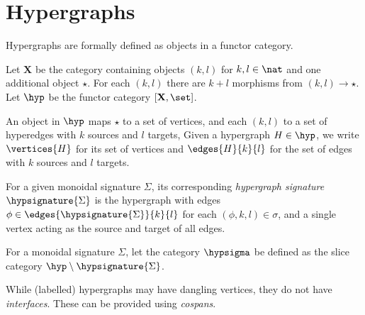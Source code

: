 \section{Hypergraphs}

Hypergraphs are formally defined as objects in a functor category.

\begin{definition}[Hypergraph]
    Let \(\mathbf{X}\) be the category containing objects \((k, l)\) for
    \(k, l \in \nat\) and one additional object \(\star\).
    For each \((k, l)\) there are \(k + l\) morphisms from \((k, l) \to \star\).
    Let \(\hyp\) be the functor category \([\mathbf{X},\set]\).
\end{definition}

An object in \(\hyp\) maps \(\star\) to a set of vertices, and each \((k,l)\) to
a set of hyperedges with \(k\) sources and \(l\) targets,
Given a hypergraph \(H \in \hyp\), we write \(\vertices{H}\) for its set of
vertices and \(\edges{H}{k}{l}\) for the set of edges with \(k\) sources and
\(l\) targets.

\begin{definition}
    For a given monoidal signature \(\Sigma\), its corresponding
    \emph{hypergraph signature} \(\hypsignature{\Sigma}\) is the hypergraph with
    edges \(\phi \in \edges{\hypsignature{\Sigma}}{k}{l}\) for each
    \((\phi, k, l) \in \sigma\), and a single vertex acting as the source and
    target of all edges.
\end{definition}

\begin{definition}
    For a monoidal signature \(\Sigma\), let the category \(\hypsigma\) be
    defined as the slice category \(\hyp \setminus \hypsignature{\Sigma}\).
\end{definition}

While (labelled) hypergraphs may have dangling vertices, they do not have \emph{interfaces}.
These can be provided using \emph{cospans}.

